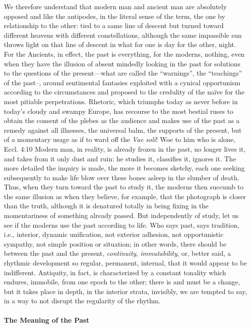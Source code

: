 We therefore understand that modern man and ancient man are absolutely opposed and like the antipodes, in the literal sense of the term, the one by relationship to the other: tied to a same line of descent but turned toward different heavens with different constellations, although the same impassible sun throws light on that line of descent in what for one is day for the other, night. For the Ancients, in effect, the past is everything, for the moderns, nothing, even when they have the illusion of absent mindedly looking in the past for solutions to the questions of the present---what are called the ``warnings'', the ``teachings'' of the past--, around sentimental fantasies exploited with a cynical opportunism according to the circumstances and proposed to the credulity of the naïve for the most pitiable perpetrations. Rhetoric, which triumphs today as never before in today's cloudy and swampy Europe, has recourse to the most bestial ruses to obtain the consent of the plebes as the audience and makes use of the past as a remedy against all illnesses, the universal balm, the supports of the present, but of a momentary usage as if to ward off the \emph{Vae soli}! Woe to him who is alone, Eccl. 4:10 Modern man, in reality, is already frozen in the past, no longer lives it, and takes from it only dust and ruin: he studies it, classifies it, ignores it. The more detailed the inquiry is made, the more it becomes sketchy, each one seeking subsequently to make life blow over these bones asleep in the slumber of death. Thus, when they turn toward the past to study it, the moderns then succumb to the same illusion as when they believe, for example, that the photograph is closer than the truth, although it is denatured totally in being fixing in the momentariness of something already passed. But independently of study, let us see if the moderns use the past according to life. Who says past, says tradition, i.e., interior, dynamic unification, not exterior adhesion, not opportunistic sympathy, not simple position or situation; in other words, there should be between the past and the present, \emph{continuity}, \emph{immutability}, or, better said, a rhythmic development so regular, permanent, internal, that it would appear to be indifferent. Antiquity, in fact, is characterized by a constant tonality which endures, immobile, from one epoch to the other; there is and must be a change, but it takes place in depth, in the interior strata, invisibly, we are tempted to say, in a way to not disrupt the regularity of the rhythm.


\paragraph{The Meaning of the Past}

